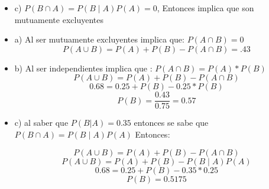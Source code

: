 \documentclass{../oxmathproblems}
\begin{document}
\begin{questions}
\begin{itemize}
\item c) $P(B \cap A) = P(B \mid  A) P(A) = 0$, Entonces implica que son mutuamente excluyentes

\end{itemize}


\miquestion 

\begin{itemize}

\item a) 
Al ser mutuamente excluyentes implica que: $P(A \cap B) = 0$
$$P(A \cup B)= P(A) + P(B) - P(A\cap B) = .43$$

\item b)
Al ser independientes implica que : $P(A \cap B) = P(A)*P(B) $
$$P(A \cup B)= P(A) + P(B) - P(A\cap B)$$
$$0.68 = 0.25 + P(B) - 0.25*P(B) $$
$$P(B) = \frac{0.43}{0.75} = 0.57$$

\item c) al saber que $P(B|A) = 0.35$ entonces se sabe que $P(B \cap A) = P(B \mid A)P(A)$ Entonces: 

$$ P(A \cup B)= P(A) + P(B) - P(A \cap B) $$
$$ P(A \cup B) = P(A) + P(B) - P(B \mid A) P(A)$$ 
$$ 0.68 = 0.25 + P(B) - 0.35 * 0.25$$ 
$$ P(B)= 0.5175 $$ 

\end{itemize}


\end{questions}
\end{document}
